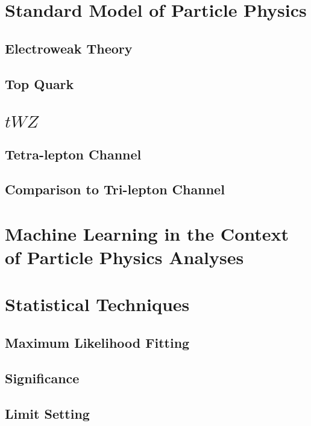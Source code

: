 \section{Standard Model of Particle Physics}
\subsection{Electroweak Theory}
\subsection{Top Quark}
\section{$tWZ$}
\subsection{Tetra-lepton Channel}
\subsection{Comparison to Tri-lepton Channel}
\section{Machine Learning in the Context of Particle Physics Analyses}
\section{Statistical Techniques}
\subsection{Maximum Likelihood Fitting}
\subsection{Significance}
\subsection{Limit Setting} 

